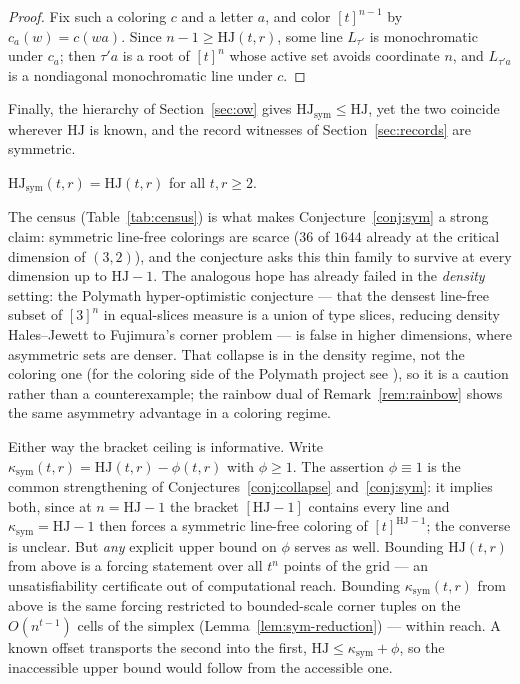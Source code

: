 \documentclass[12pt]{article}
\newcommand{\HJ}{\mathrm{HJ}}
\newcommand{\Ls}{L}
\newcommand{\ksym}{\kappa_{\mathrm{sym}}}
\begin{document}
\begin{proof}
Fix such a coloring $c$ and a letter $a$, and color $[t]^{n-1}$ by
$c_{a}(w)=c(wa)$. Since $n-1\ge\HJ(t,r)$, some line $\Ls_{\tau'}$ is
monochromatic under $c_{a}$; then $\tau'a$ is a root of $[t]^{n}$ whose
active set avoids coordinate $n$, and $\Ls_{\tau'a}$ is a nondiagonal
monochromatic line under $c$.
\end{proof}

Finally, the hierarchy of Section~\ref{sec:ow} gives
$\HJ_{\mathrm{sym}}\le\HJ$, yet the two coincide wherever $\HJ$ is
known, and the record witnesses of Section~\ref{sec:records} are
symmetric.

\begin{conjecture}\label{conj:sym}
$\HJ_{\mathrm{sym}}(t,r)=\HJ(t,r)$ for all $t,r\ge 2$.
\end{conjecture}

\begin{remark}\label{rem:sym-evidence}
The census (Table~\ref{tab:census}) is what makes
Conjecture~\ref{conj:sym} a strong claim: symmetric line-free colorings
are scarce ($36$ of $1644$ already at the critical dimension of
$(3,2)$), and the conjecture asks this thin family to survive at every
dimension up to $\HJ-1$. The analogous hope has already failed in the
\emph{density} setting: the Polymath hyper-optimistic conjecture
\cite{PolymathWikiHOC,PolymathDHJMoser} --- that the densest line-free
subset of $[3]^{n}$ in equal-slices measure is a union of type slices,
reducing density Hales--Jewett
\cite{furstenbergKatznelson1991,polymath2012} to Fujimura's corner
problem --- is false in higher dimensions, where asymmetric sets are
denser. That collapse is in the density regime, not the coloring one
(for the coloring side of the Polymath project see
\cite{PolymathWikiColoring}), so it is a caution rather than a
counterexample; the rainbow dual of Remark~\ref{rem:rainbow} shows the
same asymmetry advantage in a coloring regime.
\end{remark}

\begin{remark}\label{rem:offset}
Either way the bracket ceiling is informative. Write
$\ksym(t,r)=\HJ(t,r)-\phi(t,r)$ with $\phi\ge 1$. The assertion
$\phi\equiv 1$ is the common strengthening of
Conjectures~\ref{conj:collapse} and~\ref{conj:sym}: it implies both,
since at $n=\HJ-1$ the bracket $[\HJ-1]$ contains every line and
$\ksym=\HJ-1$ then forces a symmetric line-free coloring of
$[t]^{\HJ-1}$; the converse is unclear. But \emph{any} explicit upper
bound on $\phi$ serves as well. Bounding $\HJ(t,r)$ from above is a
forcing statement over all $t^{n}$ points of the grid --- an
unsatisfiability certificate out of computational reach. Bounding
$\ksym(t,r)$ from above is the same forcing restricted to bounded-scale
corner tuples on the $O(n^{t-1})$ cells of the simplex
(Lemma~\ref{lem:sym-reduction}) --- within reach. A known offset
transports the second into the first, $\HJ\le\ksym+\phi$, so the
inaccessible upper bound would follow from the accessible one.
\end{remark}
\end{document}
